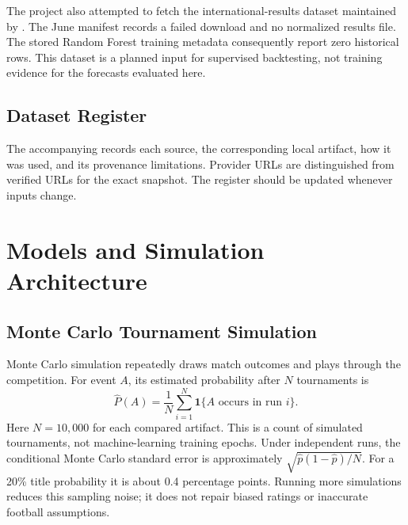 The project also attempted to fetch the international-results dataset maintained
by  \cite{data-historical}. The June manifest
records a failed download and no normalized results file. The stored Random
Forest training metadata consequently report zero historical rows. This
dataset is a planned input for supervised backtesting, not training evidence
for the forecasts evaluated here.
\subsection{Dataset Register}
The accompanying  records each source, the corresponding
local artifact, how it was used, and its provenance limitations. Provider URLs
are distinguished from verified URLs for the exact snapshot. The register
should be updated whenever inputs change.
\clearpage

\section{Models and Simulation Architecture}
\label{sec:models}
\subsection{Monte Carlo Tournament Simulation}
Monte Carlo simulation repeatedly draws match outcomes and plays through the
competition. For event $A$, its estimated probability after $N$ tournaments is
\begin{equation}
\widehat{P}(A)=\frac{1}{N}\sum_{i=1}^{N}\mathbf{1}\{A\text{ occurs in run }i\}.
\end{equation}
Here $N=10{,}000$ for each compared artifact. This is a count of simulated
tournaments, not machine-learning training epochs. Under independent runs,
the conditional Monte Carlo standard error is approximately
$\sqrt{\widehat p(1-\widehat p)/N}$. For a 20\% title probability it is about
0.4 percentage points. Running more simulations reduces this sampling noise;
it does not repair biased ratings or inaccurate football assumptions.

